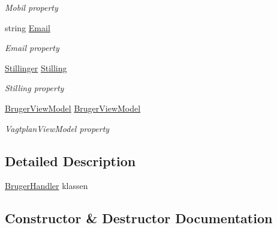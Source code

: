 \begin{DoxyCompactItemize}
\begin{DoxyCompactList}\small\item\em Mobil property \end{DoxyCompactList}\item 
string \hyperlink{class__1aarsproeve_1_1_handler_1_1_bruger_handler_af33dede46e01ca7ef2cfc2ca95c344d5}{Email}
\begin{DoxyCompactList}\small\item\em Email property \end{DoxyCompactList}\item 
\hyperlink{class__1aarsproeve_1_1_model_1_1_stillinger}{Stillinger} \hyperlink{class__1aarsproeve_1_1_handler_1_1_bruger_handler_a46805384d3593dfcd0fdbd0bd9c24257}{Stilling}
\begin{DoxyCompactList}\small\item\em Stilling property \end{DoxyCompactList}\item 
\hyperlink{class__1aarsproeve_1_1_view_model_1_1_bruger_view_model}{Bruger\+View\+Model} \hyperlink{class__1aarsproeve_1_1_handler_1_1_bruger_handler_a69a5dd6590516a3d988312cca1468578}{Bruger\+View\+Model}
\begin{DoxyCompactList}\small\item\em Vagtplan\+View\+Model property \end{DoxyCompactList}\end{DoxyCompactItemize}


\subsection{Detailed Description}
\hyperlink{class__1aarsproeve_1_1_handler_1_1_bruger_handler}{Bruger\+Handler} klassen 



\subsection{Constructor \& Destructor Documentation}
\hypertarget{class__1aarsproeve_1_1_handler_1_1_bruger_handler_a6813940a8cecb133be93b4f0f0ac8b25}{}
